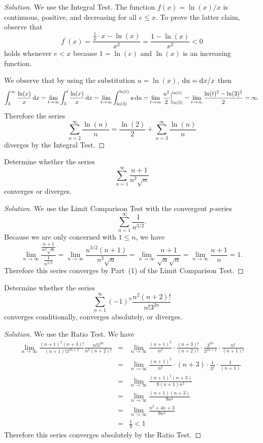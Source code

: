 \documentclass[12pt]{amsart}
\begin{document}
\begin{proof}[Solution]
  We use the Integral Test.
  The function \(f(x) = \ln(x)/x\) is continuous, positive, and decreasing for all \(e \leq x\).
  To prove the latter claim, observe that
  \[f^\prime(x) = \frac{\frac{1}{x} \cdot x - \ln(x)}{x^2} = \frac{1 - \ln(x)}{x^2} < 0\]
  holds whenever \(e < x\) because \(1 = \ln(e)\) and \(\ln(x)\) is an increasing function.
  
  We observe that by using the substitution \(u = \ln(x)\), \(\dif u = \dif x / x\) then
  \[\int_3^\infty \frac{\ln(x)}{x}\dif x = \lim_{t \to \infty} \int_3^t \frac{\ln(x)}{x}\dif x = \lim_{t \to \infty} \int_{\ln(3)}^{\ln(t)} u\dif u = \lim_{t \to \infty} \frac{u^2}{2}\Big|_{\ln(3)}^{\ln(t)} = \lim_{t \to \infty} \frac{\ln(t)^2 - \ln(3)^2}{2} = \infty.\]
  Therefore the series
  \[\sum_{n=2}^\infty \frac{\ln(n)}{n} = \frac{\ln(2)}{2} + \sum_{n=3}^\infty \frac{\ln(n)}{n}\]
  diverges by the Integral Test.
\end{proof}

\begin{thm}[10 Points]
  Determine whether the series
  \[\sum_{n=1}^\infty \frac{n+1}{n^2\sqrt{n}}\]
  converges or diverges.
\end{thm}

\begin{proof}[Solution]
  We use the Limit Comparison Test with the convergent \(p\)-series
  \[\sum_{n = 1}^\infty \frac{1}{n^{3/2}}.\]
  Because we are only concerned with \(1 \leq n\), we have
  \[\lim_{n \to \infty} \frac{\frac{n + 1}{n^2\sqrt{n}}}{\frac{1}{n^{3/2}}}
  = \lim_{n \to \infty} \frac{n^{3/2}(n + 1)}{n^2\sqrt{n}}
  = \lim_{n \to \infty} \frac{n + 1}{\sqrt{n}\sqrt{n}}
  = \lim_{n \to \infty} \frac{n + 1}{n} = 1.\]
  Therefore this series converges by Part~(1) of the Limit Comparison Test.
\end{proof}

\begin{thm}[10 Points]
  Determine whether the series
  \[\sum_{n = 1}^\infty (-1)^{n} \frac{n^2(n+2)!}{n! 3^{2n}}\]
  converges conditionally, converges absolutely, or diverges.
\end{thm}

\begin{proof}[Solution]
  We use the Ratio Test.
  We have
  \begin{eqnarray*}
    \lim_{n \to \infty} \frac{(n + 1)^2 (n + 3)!}{(n+1)!3^{2n+2}} \frac{n! 3^{2n}}{n^2(n + 2)!} &=& \lim_{n \to \infty} \frac{(n+1)^2}{n^2} \cdot \frac{(n+3)!}{(n + 2)!} \cdot \frac{3^{2n}}{3^{2n + 2}} \cdot \frac{n!}{(n+1)!}\\
    &=& \lim_{n \to \infty} \frac{(n+1)^2}{n^2} \cdot (n + 3) \cdot \frac{1}{3^2} \cdot \frac{1}{(n + 1)}\\
    &=& \lim_{n \to \infty} \frac{(n + 1)^2(n + 3)}{9(n + 1)n^2}\\
    &=& \lim_{n \to \infty} \frac{(n + 1)(n + 3)}{9n^2}\\
    &=& \lim_{n \to \infty} \frac{n^2 + 4n + 3}{9n^2}\\
    &=& \frac{1}{9} < 1
  \end{eqnarray*}
  Therefore this series converges absolutely by the Ratio Test.
\end{proof}
\end{document}
